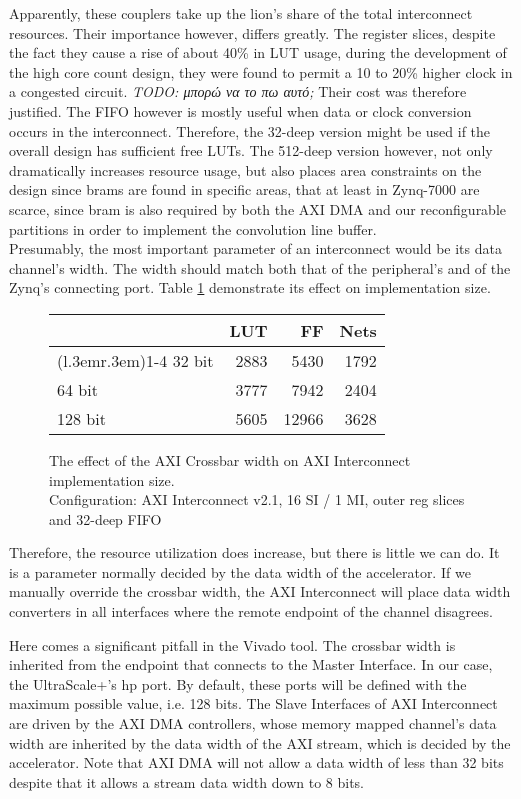 Apparently, these couplers take up the lion's share of the total interconnect resources.
Their importance however, differs greatly. 
The register slices, despite the fact they cause a rise of about 40\% in LUT usage,
during the development of the high core count design,
they were found to permit a 10 to 20\% higher clock in a congested circuit. 
\emph{TODO: μπορώ να το πω αυτό;}
Their cost was therefore justified. 
The FIFO however is mostly useful when data or clock conversion occurs in the
interconnect. Therefore, the 32-deep version might be used if the overall design
has sufficient free LUTs. The 512-deep version however,
not only dramatically increases resource usage, but also places area constraints on
the design since \glspl{bram} are found in specific areas, that at least in Zynq-7000
are scarce, since \gls{bram} is also required by both the AXI DMA and our reconfigurable
partitions in order to implement the convolution line buffer.
\\

Presumably, the most important parameter of an interconnect would be its data channel's width. 
The width should match both that of the peripheral's and of the Zynq's connecting port.
Table \ref{tab:int-width} demonstrate its effect on implementation size.

\begin{figure}[ht!]
\centering
\begin{tabular}{lrrr}
\toprule
	& LUT	& FF	& Nets \\
\cmidrule(l{.3em}r{.3em}){1-4}
32 bit	& 2883	& 5430	& 1792 \\
64 bit	& 3777	& 7942	& 2404 \\
128 bit	& 5605	& 12966	& 3628 \\
\bottomrule
\end{tabular}
\caption{The effect of the AXI Crossbar width on AXI Interconnect implementation size.\\
	Configuration: AXI Interconnect v2.1, 16 SI / 1 MI, outer reg slices and 32-deep FIFO}
\label{tab:int-width}
\end{figure}

Therefore, the resource utilization does increase, but there is little we can do.
It is a parameter normally decided by the data width of the accelerator.
If we manually override the crossbar width, the AXI Interconnect will place
data width converters in all interfaces where the remote endpoint of the channel disagrees.

Here comes a significant pitfall in the Vivado tool. The crossbar width is inherited
from the endpoint that connects to the Master Interface. In our case, the UltraScale+'s \gls{hp} port.
By default, these ports will be defined with the maximum possible value, i.e. 128 bits.
The Slave Interfaces of AXI Interconnect are driven by the AXI DMA controllers,
whose memory mapped channel's data width are inherited by the data width of the AXI stream,
which is decided by the accelerator. Note that AXI DMA will not allow a data width of less
than 32 bits despite that it allows a stream data width down to 8 bits.

